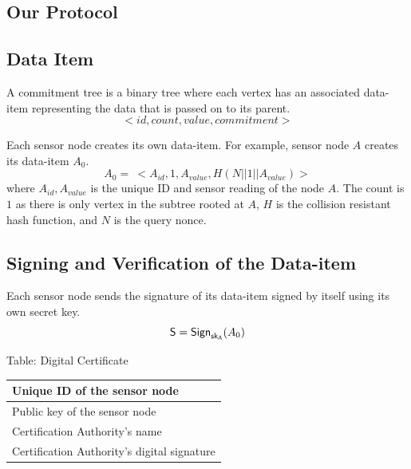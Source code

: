 \documentclass[%
  slidesonly,%
  semlayer%
  ]{seminar}                                  %
\newcommand{\sk}{\sf{sk}}
\begin{document}
\begin{slide}
\section*{Our Protocol}
    
    \subsection*{Data Item}
      \vfill
      A commitment tree is a binary tree where each vertex has an associated data-item representing the data that is passed on to its parent.
      \begin{equation*}
        < id, count, value, commitment >
      \end{equation*}

      Each sensor node creates its own data-item. 
      For example, sensor node $A$ creates its data-item $A_{0}$.
      \begin{equation*}
        A_{0} =\ <A_{id}, 1, A_{value}, H(N||1||A_{value})>
      \end{equation*}
      where $A_{id}, A_{value}$ is the unique ID and sensor reading of the node $A$. 
      The count is $1$ as there is only vertex in the subtree rooted at $A$, $H$ is the collision resistant hash function, and $N$ is the query nonce.
      \vfill
      \clearpage

    \subsection*{Signing and Verification of the Data-item}
      \vfill
      Each sensor node sends the signature of its data-item signed by itself using its own secret key. 
      \begin{equation*}
          \textsf{S} = \textsf{Sign}_{\sk_{A}}(A_{0})
        \end{equation*}
        \begin{center}
          Table: Digital Certificate
      \end{center}
      \begin{table} 
        \tiny 
          \centering
          \begin{tabular}{ |l| }
              \hline
              Unique ID of the sensor node \\
              \hline
              Public key of the sensor node \\  
              \hline
              Certification Authority's name \\
              \hline
              Certification Authority's digital signature \\
              \hline
          \end{tabular}
      \end{table}


\end{slide}
\end{document}
